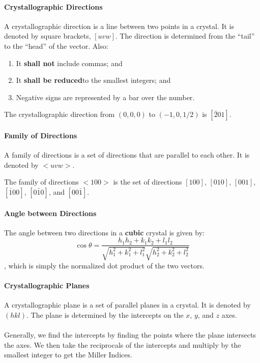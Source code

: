\documentclass[11pt]{article}
\begin{document}
\paragraph{Crystallographic Directions} A crystallographic direction is a line between two points in a crystal. It is denoted by square brackets, $[uvw]$. The direction is determined from the ``tail'' to the ``head'' of the vector. Also:
\begin{enumerate}
    \item It \textbf{shall not} include commas; and
    \item It \textbf{shall be reduced}to the smallest integers; and
    \item Negative signs are represented by a bar over the number.
\end{enumerate}
\begin{example}
    The crystallographic direction from $(0,0,0)$ to $(-1,0,1/2)$ is $[\bar{2}01]$.
\end{example}
\paragraph{Family of Directions} A family of directions is a set of directions that are parallel to each other. It is denoted by $<uvw>$.
\begin{example}
    The family of directions $<100>$ is the set of directions $[100]$, $[010]$, $[001]$, $[\bar{1}00]$, $[0\bar{1}0]$, and $[00\bar{1}]$.
\end{example}
\paragraph{Angle between Directions} The angle between two directions in a \textbf{cubic} crystal is given by:
\begin{equation}
    \cos \theta = \frac{h_1h_2 + k_1k_2 + l_1l_2}{\sqrt{h_1^2 + k_1^2 + l_1^2}\sqrt{h_2^2 + k_2^2 + l_2^2}}
\end{equation}
, which is simply the normalized dot product of the two vectors.
\paragraph{Crystallographic Planes} A crystallographic plane is a set of parallel planes in a crystal. It is denoted by $(hkl)$. The plane is determined by the intercepts on the $x$, $y$, and $z$ axes. 
\paragraph{} Generally, we find the intercepts by finding the points where the plane intersects the axes. We then take the reciprocals of the intercepts and multiply by the smallest integer to get the Miller Indices.
\end{document}
